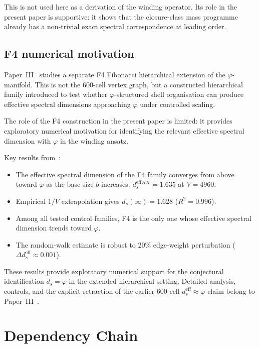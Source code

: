 \documentclass[12pt]{article}
\newcommand{\phig}{\varphi}
\newcommand{\ds}{d_s}
\newcommand{\dseff}{d_s^{\mathrm{eff}}}
\begin{document}
This is not used here as a derivation of the winding operator. Its role in the present paper is supportive: it shows that the closure-class mass programme already has a non-trivial exact spectral correspondence at leading order.

\subsection{F4 numerical motivation}\label{sec:F4}

Paper~III~\citep{SmartIII} studies a separate F4 Fibonacci hierarchical extension of the $\phig$-manifold. This is not the 600-cell vertex graph, but a constructed hierarchical family introduced to test whether $\phig$-structured shell organisation can produce effective spectral dimensions approaching $\phig$ under controlled scaling.

The role of the F4 construction in the present paper is limited: it provides exploratory numerical motivation for identifying the relevant effective spectral dimension with $\phig$ in the winding ansatz.

Key results from~\citep{SmartIII}:
\begin{itemize}
    \item The effective spectral dimension of the F4 family converges from above toward $\phig$ as the base size $b$ increases: $\dseff^{HK} = 1.635$ at $V = 4960$.
    \item Empirical $1/V$ extrapolation gives $\ds(\infty) = 1.628$ ($R^2 = 0.996$).
    \item Among all tested control families, F4 is the only one whose effective spectral dimension trends toward $\phig$.
    \item The random-walk estimate is robust to $20\%$ edge-weight perturbation ($\Delta \dseff \approx 0.001$).
\end{itemize}

These results provide exploratory numerical support for the conjectural identification $\ds = \phig$ in the extended hierarchical setting. Detailed analysis, controls, and the explicit retraction of the earlier 600-cell $\dseff \approx \phig$ claim belong to Paper~III~\citep{SmartIII}.

\section{Dependency Chain}\label{sec:dependency}
\end{document}
